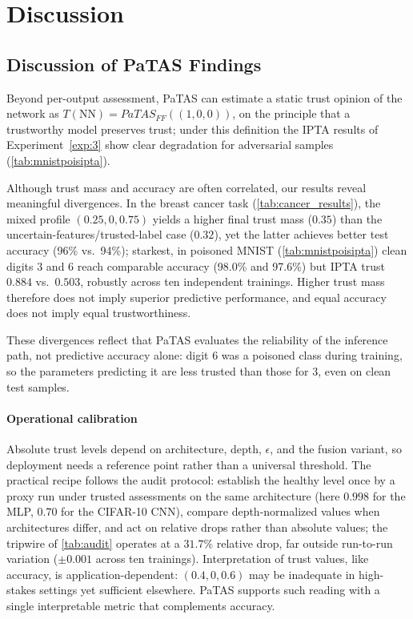 \vspace{-0.5em}
\section{Discussion}\label{sec:discussion}
\vspace{-0.2em}
\subsection{Discussion of PaTAS Findings}

Beyond per-output assessment, PaTAS can estimate a static trust opinion of the network as \(T(\text{NN}) = PaTAS_{FF}((1,0,0))\), on the principle that a trustworthy model preserves trust; under this definition the IPTA results of Experiment~\ref{exp:3} show clear degradation for adversarial samples (\cref{tab:mnistpoisipta}).

Although trust mass and accuracy are often correlated, our results reveal meaningful divergences. In the breast cancer task (\cref{tab:cancer_results}), the mixed profile \((0.25,0,0.75)\) yields a higher final trust mass (\(0.35\)) than the uncertain-features/trusted-label case (\(0.32\)), yet the latter achieves better test accuracy (96\% vs.\ 94\%); starkest, in poisoned MNIST (\cref{tab:mnistpoisipta}) clean digits \(3\) and \(6\) reach comparable accuracy (98.0\% and 97.6\%) but IPTA trust \(0.884\) vs.\ \(0.503\), robustly across ten independent trainings. Higher trust mass therefore does not imply superior predictive performance, and equal accuracy does not imply equal trustworthiness.

These divergences reflect that PaTAS evaluates the reliability of the inference path, not predictive accuracy alone: digit \(6\) was a poisoned class during training, so the parameters predicting it are less trusted than those for \(3\), even on clean test samples. 

\paragraph*{Operational calibration} Absolute trust levels depend on architecture, depth, $\epsilon$, and the fusion variant, so deployment needs a reference point rather than a universal threshold. The practical recipe follows the audit protocol: establish the healthy level once by a proxy run under trusted assessments on the same architecture (here $0.998$ for the MLP, $0.70$ for the CIFAR-10 CNN), compare depth-normalized values when architectures differ, and act on relative drops rather than absolute values; the tripwire of \cref{tab:audit} operates at a $31.7\%$ relative drop, far outside run-to-run variation ($\pm 0.001$ across ten trainings). Interpretation of trust values, like accuracy, is application-dependent: \((0.4,0,0.6)\) may be inadequate in high-stakes settings yet sufficient elsewhere. PaTAS supports such reading with a single interpretable metric that complements accuracy.

